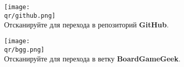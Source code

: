 \bigbreak

\begin{multicols}{2}
\centering
\texttt{[image: \\qr/github.png]}\\
Отсканируйте для перехода в репозиторий \textbf{GitHub}.

\columnbreak

\texttt{[image: \\qr/bgg.png]}\\
Отсканируйте для перехода в ветку \textbf{BoardGameGeek}.
\end{multicols}
